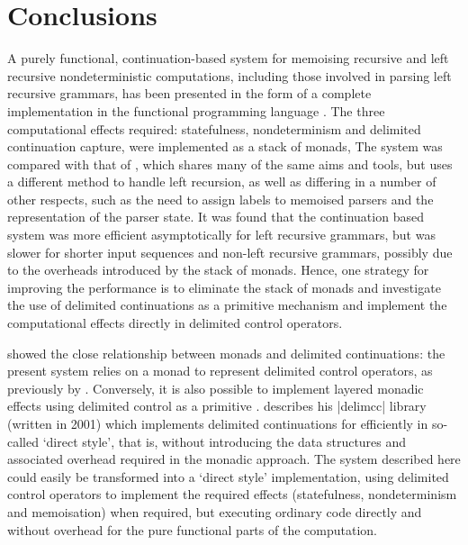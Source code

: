 
\section{Conclusions}
\label{s:conclusion}

A purely functional, continuation-based system for memoising recursive and left 
recursive nondeterministic computations, including those involved in parsing
left recursive grammars, has been presented in the form of a complete implementation
in the functional programming language \OCaml. The three computational effects 
required: statefulness, nondeterminism and delimited continuation capture, were
implemented as a stack of monads,
The system was compared with that of \citet{FrostHafizCallaghan2007},
which shares many of the same aims and tools, but uses a different method to handle
left recursion, as well as differing in a number of other respects, such as the need to
assign labels to memoised parsers and the representation of the parser state.
It was found that the continuation based system was more efficient asymptotically
for left recursive grammars, but was slower for shorter input sequences and non-left
recursive grammars, possibly due to the overheads introduced by the stack of monads.
Hence, one strategy for improving the performance is to eliminate the stack of monads and investigate the
use of delimited continuations as a primitive mechanism and implement the 
computational effects directly in delimited control operators.

\citet{Filinski1994} showed the close relationship between monads and delimited 
continuations: the present system relies on a monad to represent
delimited control operators, as previously by \citet{DyvbigJonesSabry2005}. 
Conversely, it is also possible to implement layered monadic effects using delimited control
as a primitive \cite{Filinski1999}. \citet{Kiselyov2012} describes his |delimcc| library
(written in 2001) which implements delimited continuations for \OCaml efficiently
in so-called `direct style', that is, without introducing the data structures
and associated overhead required in the monadic approach. The system described
here could easily be transformed into a `direct style' implementation, using
delimited control operators to implement the required effects (statefulness,
nondeterminism and memoisation) when required, but executing ordinary \OCaml
code directly and without overhead for the pure functional parts of the computation.

